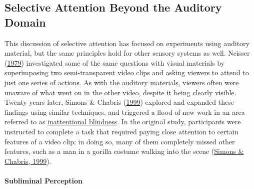 \documentclass[
]{krantz}
\begin{document}
\hypertarget{selective-attention-beyond-the-auditory-domain}{%
\subsection*{Selective Attention Beyond the Auditory Domain}\label{selective-attention-beyond-the-auditory-domain}}


This discussion of selective attention has focused on experiments using auditory material, but the same principles hold for other sensory systems as well. Neisser (\protect\hyperlink{ref-neisser1979control}{1979}) investigated some of the same questions with visual materials by superimposing two semi-transparent video clips and asking viewers to attend to just one series of actions. As with the auditory materials, viewers often were unaware of what went on in the other video, despite it being clearly visible. Twenty years later, Simons \& Chabris (\protect\hyperlink{ref-Simons1999}{1999}) explored and expanded these findings using similar techniques, and triggered a flood of new work in an area referred to as \protect\hyperlink{inattentional-blindness}{inattentional blindness}. In the original study, participants were instructed to complete a task that required paying close attention to certain features of a video clip; in doing so, many of them completely missed other features, such as a man in a gorilla costume walking into the scene (\protect\hyperlink{ref-Simons1999}{Simons \& Chabris, 1999}).

\hypertarget{subliminal-perception}{%
\paragraph*{Subliminal Perception}\label{subliminal-perception}}
\end{document}
